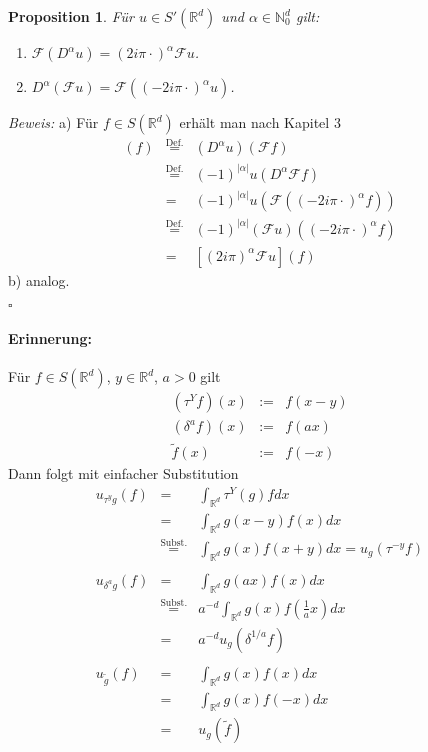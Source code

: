 \documentclass[11pt,a4paper,titlepage, ngerman]{scrartcl}
\newtheorem{Prop}[Satz]{Proposition}
\numberwithin{equation}{section}
\newcommand{\R}{\mathbb{R}} %
\newcommand{\N}{\mathbb{N}} %
\newcommand{\F}{\mathcal{F}}
\newcommand{\m}{\cdot}
\newcommand{\Bew}{\emph{Beweis: }}
\newcommand{\qed}{\begin{flushright}
		$\square$
	\end{flushright}}
\begin{document}
	\begin{Prop}
		Für $u\in S'(\R^d)$ und $\alpha\in \N_0^d$ gilt:
		\begin{enumerate}
			\item[a)] $\F(D^\alpha u) = (2i\pi \m)^\alpha \F u$.
			\item[b)] $D^\alpha (\F u) = \F((-2i\pi \m)^\alpha u)$.
		\end{enumerate}
	\end{Prop}
	\Bew a) Für $f\in S(\R^d)$ erhält man nach Kapitel 3
	\begin{eqnarray}
		[\F(D^\alpha u)](f)&\overset{\text{Def.}}{=}& (D^\alpha u)(\F f)\nonumber\\
		&\overset{\text{Def.}}{=} & (-1)^{|\alpha|} u(D^\alpha \F f)\nonumber\\
		&=& (-1)^{|\alpha|} u (\F((-2i\pi\m)^\alpha f)) \nonumber\\
		&\overset{\text{Def.}}{=}& (-1)^{|\alpha|}(\F u)((-2i\pi\m)^\alpha f)\nonumber\\
		&=& [(2i\pi)^\alpha \F u](f)\nonumber
	\end{eqnarray}
	b) analog.
	\qed
	
	\paragraph{Erinnerung:} Für $f\in S(\R^d)$, $y\in \R^d$, $a>0$ gilt
	\begin{eqnarray}
		(\tau^Y f)(x) &:=& f(x-y)\nonumber\\
		(\delta^a f)(x)&:=& f(ax)\nonumber\\
		\tilde{f}(x) &:= & f(-x)\nonumber
	\end{eqnarray}
	Dann folgt mit einfacher Substitution
	\begin{eqnarray}
		u_{\tau^y g}(f) &=& \int_{\R^d} \tau^Y(g)f dx \nonumber\\
		&=& \int_{\R^d}g(x-y) f(x) dx \nonumber\\
		&\overset{\text{Subst.}}{=}& \int_{\R^d} g(x)f(x+y)dx = u_g(\tau^{-y}f)\nonumber\\\nonumber \\
		u_{\delta^a g}(f) &=& \int_{\R^d}g(ax)f(x)dx \nonumber\\
		&\overset{\text{Subst.}}{=}& a^{-d}\int_{\R^d} g(x)f(\frac{1}{a}x)dx \nonumber\\
		&=& a^{-d}u_g(\delta^{1/a}f)\nonumber\\\nonumber\\
		u_{\tilde{g}}(f) &=& \int_{\R^d}g(x)f(x)dx \nonumber\\
		&=& \int_{\R^d}g(x)f(-x) dx\nonumber\\
		&=& u_g(\tilde{f})\nonumber
	\end{eqnarray}
	
\end{document}
